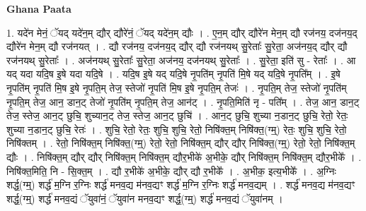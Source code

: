 \documentclass[17pt]{extarticle}
\begin{document}
\textbf{Ghana Paata } \newline

1. यदे॑न मेनं॒ ॅयद् यदे॑न॒म् द्यौर् द्यौरे॑नं॒ ॅयद् यदे॑न॒म् द्यौः । . ए॒न॒म् द्यौर् द्यौरे॑न मेन॒म् द्यौ रज॑नय॒ दज॑नय॒द् द्यौरे॑न मेन॒म् द्यौ रज॑नयत् । . द्यौ रज॑नय॒ दज॑नय॒द् द्यौर् द्यौ रज॑नयथ् सु॒रेताः᳚ सु॒रेता॒ अज॑नय॒द् द्यौर् द्यौ रज॑नयथ् सु॒रेताः᳚ । . अज॑नयथ् सु॒रेताः᳚ सु॒रेता॒ अज॑नय॒ दज॑नयथ् सु॒रेताः᳚ । . सु॒रेता॒ इति॑ सु - रेताः᳚ । . आ यद् यदा यदि॒ष इ॒षे यदा यदि॒षे । . यदि॒ष इ॒षे यद् यदि॒षे नृ॒पति॑म् नृ॒पति॑ मि॒षे यद् यदि॒षे नृ॒पति᳚म् । . इ॒षे नृ॒पति॑म् नृ॒पति॑ मि॒ष इ॒षे नृ॒पति॒म् तेज॒ स्तेजो॑ नृ॒पति॑ मि॒ष इ॒षे नृ॒पति॒म् तेजः॑ । . नृ॒पति॒म् तेज॒ स्तेजो॑ नृ॒पति॑म् नृ॒पति॒म् तेज॒ आन॒ डान॒ट् तेजो॑ नृ॒पति॑म् नृ॒पति॒म् तेज॒ आन॑ट् । . नृ॒पति॒मिति॑ नृ - पति᳚म् । . तेज॒ आन॒ डान॒ट् तेज॒ स्तेज॒ आन॒ट् छुचि॒ शुच्यान॒ट् तेज॒ स्तेज॒ आन॒ट् छुचि॑ । . आन॒ट् छुचि॒ शुच्या न॒डान॒ट् छुचि॒ रेतो॒ रेतः॒ शुच्या न॒डान॒ट् छुचि॒ रेतः॑ । . शुचि॒ रेतो॒ रेतः॒ शुचि॒ शुचि॒ रेतो॒ निषि॑क्त॒म् निषि॑क्त॒(ग्म्॒) रेतः॒ शुचि॒ शुचि॒ रेतो॒ निषि॑क्तम् । . रेतो॒ निषि॑क्त॒म् निषि॑क्त॒(ग्म्॒) रेतो॒ रेतो॒ निषि॑क्त॒म् द्यौर् द्यौर् निषि॑क्त॒(ग्म्॒) रेतो॒ रेतो॒ निषि॑क्त॒म् द्यौः । . निषि॑क्त॒म् द्यौर् द्यौर् निषि॑क्त॒म् निषि॑क्त॒म् द्यौर॒भीके॑ अ॒भीके॒ द्यौर् निषि॑क्त॒म् निषि॑क्त॒म् द्यौर॒भीके᳚ । . निषि॑क्त॒मिति॒ नि - सि॒क्त॒म् । . द्यौ र॒भीके॑ अ॒भीके॒ द्यौर् द्यौ र॒भीके᳚ । . अ॒भीक॒ इत्य॒भीके᳚ । . अ॒ग्निः शर्द्ध॒(ग्म्॒) शर्द्ध॑ म॒ग्नि र॒ग्निः शर्द्ध॑ मनव॒द्य म॑नव॒द्यꣳ शर्द्ध॑ म॒ग्नि र॒ग्निः शर्द्ध॑ मनव॒द्यम् । . शर्द्ध॑ मनव॒द्य म॑नव॒द्यꣳ शर्द्ध॒(ग्म्॒) शर्द्ध॑ मनव॒द्यं ॅयुवा॑नं॒ ॅयुवा॑न मनव॒द्यꣳ शर्द्ध॒(ग्म्॒) शर्द्ध॑ मनव॒द्यं ॅयुवा॑नम् । \newline
\end{document}
